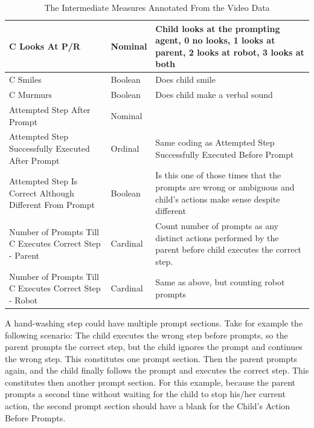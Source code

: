 \documentclass{ut-thesis}
\begin{document}
\begin{table}[H]
\begin{tabular}{ | p{5cm} | l | p{7cm} | }
		C Looks At P/R	&	Nominal	&	Child looks at the prompting agent, 0 no looks, 1 looks at parent, 2 looks at robot, 3 looks at both	\\	\hline
		C Smiles	&	Boolean	&	Does child smile	\\	\hline
		C Murmurs	&	Boolean	&	Does child make a verbal sound	\\	\hline

		Attempted Step After Prompt	&	Nominal	&	\\	\hline
		Attempted Step Successfully Executed After Prompt	&	Ordinal	&	Same coding as Attempted Step Successfully Executed Before Prompt	\\	\hline
		Attempted Step Is Correct Although Different From Prompt	&	Boolean	&	Is this one of those times that the prompts are wrong or ambiguous and child's actions make sense despite different	\\	\hline
		Number of Prompts Till C Executes Correct Step - Parent	&	Cardinal	&	Count number of prompts as any distinct actions performed by the parent before child executes the correct step.	\\	\hline
		Number of Prompts Till C Executes Correct Step - Robot	&	Cardinal	&	Same as above, but counting robot prompts	\\	\hline

	\end{tabular}
	\caption{The Intermediate Measures Annotated From the Video Data}
	\label{tab:IntermediateMeasures}
\end{table}

A hand-washing step could have multiple prompt sections.  Take for example the following scenario: The child executes the wrong step before prompts, so the parent prompts the correct step, but the child ignores the prompt and continues the wrong step.  This constitutes one prompt section.  Then the parent prompts again, and the child finally follows the prompt and executes the correct step.  This constitutes then another prompt section.  For this example, because the parent prompts a second time without waiting for the child to stop his/her current action, the second prompt section should have a blank for the Child's Action Before Prompts.
\end{document}
